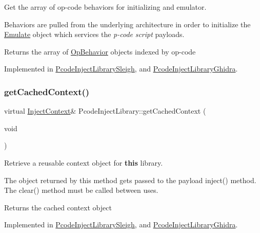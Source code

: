 Get the array of op-\/code behaviors for initializing and emulator. 

Behaviors are pulled from the underlying architecture in order to initialize the \mbox{\hyperlink{class_emulate}{Emulate}} object which services the {\itshape p-\/code} {\itshape script} payloads. \begin{DoxyReturn}{Returns}
the array of \mbox{\hyperlink{class_op_behavior}{Op\+Behavior}} objects indexed by op-\/code 
\end{DoxyReturn}


Implemented in \mbox{\hyperlink{class_pcode_inject_library_sleigh_a878ef6bdf58bd19fa82318248836b3d8}{Pcode\+Inject\+Library\+Sleigh}}, and \mbox{\hyperlink{class_pcode_inject_library_ghidra_a1195225ccb9918e6ca0b62d9a932b66f}{Pcode\+Inject\+Library\+Ghidra}}.

\mbox{\label{class_pcode_inject_library_a3a1ca9f7ea2cea02de1141cc35c79b18}} 
\subsubsection{\texorpdfstring{getCachedContext()}{getCachedContext()}}
{\footnotesize\ttfamily virtual \mbox{\hyperlink{class_inject_context}{Inject\+Context}}\& Pcode\+Inject\+Library\+::get\+Cached\+Context (\begin{DoxyParamCaption}\item[{void}]{ }\end{DoxyParamCaption})\hspace{0.3cm}{\ttfamily [pure virtual]}}



Retrieve a reusable context object for {\bfseries{this}} library. 

The object returned by this method gets passed to the payload inject() method. The clear() method must be called between uses. \begin{DoxyReturn}{Returns}
the cached context object 
\end{DoxyReturn}


Implemented in \mbox{\hyperlink{class_pcode_inject_library_sleigh_a37471f5a78e16c84fc26cfaff1a7434b}{Pcode\+Inject\+Library\+Sleigh}}, and \mbox{\hyperlink{class_pcode_inject_library_ghidra_a59bd920e9392308e571f2e18b30537a6}{Pcode\+Inject\+Library\+Ghidra}}.

